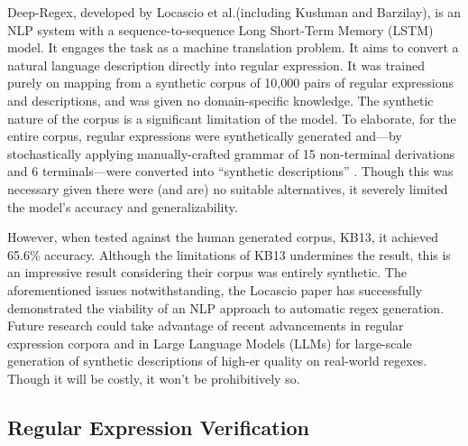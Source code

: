 \documentclass[10pt,twocolumn]{article}
\begin{document}
Deep-Regex, developed by Locascio et al.(including Kushman and Barzilay), is an NLP system with a sequence-to-sequence Long Short-Term Memory (LSTM) model\cite{locascio2016}. It engages the task as a machine translation problem. It aims to convert a natural language description directly into regular expression. It was trained purely on mapping from a synthetic corpus of 10,000 pairs of regular expressions and descriptions, and was given no domain-specific knowledge. The synthetic nature of the corpus is a significant limitation of the model. To elaborate, for the entire corpus, regular expressions were synthetically generated and—by stochastically applying manually-crafted grammar of 15 non-terminal derivations and 6 terminals—were converted into ``synthetic descriptions'' \cite{locascio2016}. Though this was necessary given there were (and are) no suitable alternatives, it severely limited the model's accuracy and generalizability.

However, when tested against the human generated corpus, KB13, it achieved 65.6\% accuracy. Although the limitations of KB13 undermines the result, this is an impressive result considering their corpus was entirely synthetic. The aforementioned issues notwithstanding, the Locascio paper has successfully demonstrated the viability of an NLP approach to automatic regex generation. Future research could take advantage of recent advancements in regular expression corpora and in Large Language Models (LLMs) for large-scale generation of synthetic descriptions of high-er quality on real-world regexes. Though it will be costly, it won't be prohibitively so.

\subsection{Regular Expression Verification}
\end{document}
